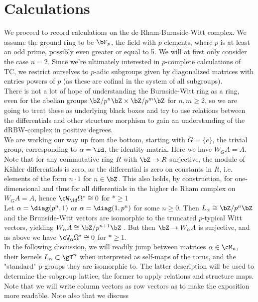 \section{Calculations}
We proceed to record calculations on the de Rham-Burnside-Witt complex. We
assume the ground ring to be $\bF_p$, the field with $p$ elements, where $p$ is
at least an odd prime, possibly even greater or equal to 5. We will at first
only consider the case $n=2$. Since we're ultimately interested in $p$-complete
calculations of TC, we restrict ourselves to $p$-adic subgroups given by
diagonalized matrices with entries powers of $p$ (as these are cofinal in the
system of all subgroups).\\
There is not a lot of hope of understanding the Burnside-Witt ring as a ring,
even for the abelian groups $\bZ/p^n\bZ \times \bZ/p^m\bZ$ for $n,m \geq 2$, so
we are going to treat these as underlying black boxes and try to use relations
between the differentials and other structure morphism to gain an understanding
of the dRBW-complex in positive degrees.\\
We are working our way up from the bottom, starting with $G=\{e\}$, the trivial
group, corresponding to $\alpha = \id$, the identity matrix. Here we have $W_G A
= A$. Note that for any commutative ring $R$ with $\bZ \to R$ surjective, the
module of K\"ahler differentials is zero, as the differential is zero on
constants in $R$, i.e. elements of the form $n \cdot 1$ for $n \in \bZ$. This
also holds, by construction, for one-dimensional and thus for all differentials
in the higher de Rham complex on $W_G A = A$, hence $\cW_{\id}\Omega^* \cong 0$
for $* \geq 1$\\
Let $\alpha = \diag(p^n, 1)$ or $\alpha = \diag(1,p^n)$ for some $n \geq 0$.
Then $L_\alpha \cong \bZ/p^n\bZ$ and the Brunside-Witt vectors are isomorphic to
the truncated $p$-typical Witt vectors, yielding $W_\alpha A \cong
\bZ/p^{n+1}\bZ$ . But then $\bZ \to W_\alpha
A$ is surjective, and as above we have $\cW_{\alpha}\Omega^* \cong 0$ for $*
\geq 1$.\\
In the following discussion, we will readily jump between matrices $\alpha \in
\cM_n$, their kernels $L_\alpha \subset \gT^n$ when interpreted as self-maps of the
torus, and the "standard" p-groups they are isomorphic to. The latter
description will be used to determine the subgroup lattice, the former to apply
relations and structure maps. Note that we will write column vectors as row
vectors as to make the exposition more readable. Note also that we discuss
